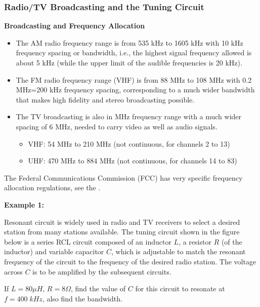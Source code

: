 \documentclass{article}
\begin{document}
\subsubsection*{Radio/TV Broadcasting and the Tuning Circuit}

{\bf Broadcasting and Frequency Allocation}

\begin{itemize}
\item The AM radio frequency range is from 535 kHz to 1605 kHz with 10 kHz
  frequency spacing or bandwidth, i.e., the highest signal frequency allowed 
  is about 5 kHz (while the upper limit of the audible frequencies is 20 kHz). 
\item The FM radio frequency range (VHF) is from 88 MHz to 108 MHz with 
  0.2 MHz=200 kHz frequency spacing, corresponding to a much wider
  bandwidth that makes high fidelity and stereo broadcasting possible. 
\item The TV broadcasting is also in MHz frequency range with a much wider 
  spacing of 6 MHz, needed to carry video as well as audio signals. 
  \begin{itemize}
  \item VHF: 54 MHz to 210 MHz (not continuous, for channels 2 to 13) 
  \item UHF: 470 MHz to 884 MHz (not continuous, for channels 14 to 83)
  \end{itemize}
\end{itemize}

The Federal Communications Commission (FCC) has very specific frequency allocation 
regulations, see the .



{\bf Example 1:}

Resonant circuit is widely used in radio and TV receivers to select a 
desired station from many stations available. The tuning circuit shown 
in the figure below is a series RCL circuit composed of an inductor 
$L$, a resistor $R$ (of the inductor) and variable capacitor $C$, which
is adjustable to match the resonant frequency of the circuit to the 
frequency of the desired radio station. The voltage across $C$ is to 
be amplified by the subsequent circuits.

If $L=80\mu H$, $R=8\Omega$, find the value of $C$ for this circuit to 
resonate at $f=400\;kHz$, also find the bandwidth.

\end{document}
